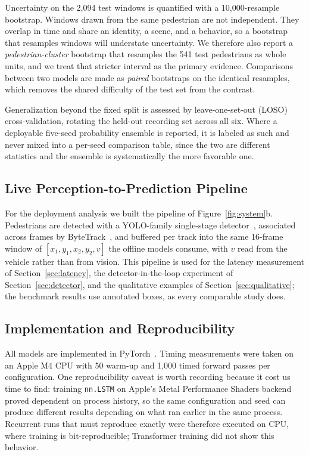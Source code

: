 \documentclass[mti,article,submit,moreauthors]{Definitions/mdpi}
\begin{document}
Uncertainty on the 2,094 test windows is quantified with a 10,000-resample bootstrap. Windows drawn from the same pedestrian are not independent. They overlap in time and share an identity, a scene, and a behavior, so a bootstrap that resamples windows will understate uncertainty. We therefore also report a \emph{pedestrian-cluster} bootstrap that resamples the 541 test pedestrians as whole units, and we treat that stricter interval as the primary evidence. Comparisons between two models are made as \emph{paired} bootstraps on the identical resamples, which removes the shared difficulty of the test set from the contrast.

Generalization beyond the fixed split is assessed by leave-one-set-out (LOSO) cross-validation, rotating the held-out recording set across all six. Where a deployable five-seed probability ensemble is reported, it is labeled as such and never mixed into a per-seed comparison table, since the two are different statistics and the ensemble is systematically the more favorable one.

\subsection{Live Perception-to-Prediction Pipeline}
\label{sec:pipeline}

For the deployment analysis we built the pipeline of Figure~\ref{fig:system}b. Pedestrians are detected with a YOLO-family single-stage detector~\citep{redmon2016yolo,jocher2025yolo}, associated across frames by ByteTrack~\citep{zhang2022bytetrack}, and buffered per track into the same 16-frame window of $[x_1, y_1, x_2, y_2, v]$ the offline models consume, with $v$ read from the vehicle rather than from vision. This pipeline is used for the latency measurement of Section~\ref{sec:latency}, the detector-in-the-loop experiment of Section~\ref{sec:detector}, and the qualitative examples of Section~\ref{sec:qualitative}; the benchmark results use annotated boxes, as every comparable study does.

\subsection{Implementation and Reproducibility}
\label{sec:implementation}

All models are implemented in PyTorch~\citep{paszke2019pytorch}. Timing measurements were taken on an Apple M4 CPU with 50 warm-up and 1,000 timed forward passes per configuration. One reproducibility caveat is worth recording because it cost us time to find: training \texttt{nn.LSTM} on Apple's Metal Performance Shaders backend proved dependent on process history, so the same configuration and seed can produce different results depending on what ran earlier in the same process. Recurrent runs that must reproduce exactly were therefore executed on CPU, where training is bit-reproducible; Transformer training did not show this behavior.
\end{document}
